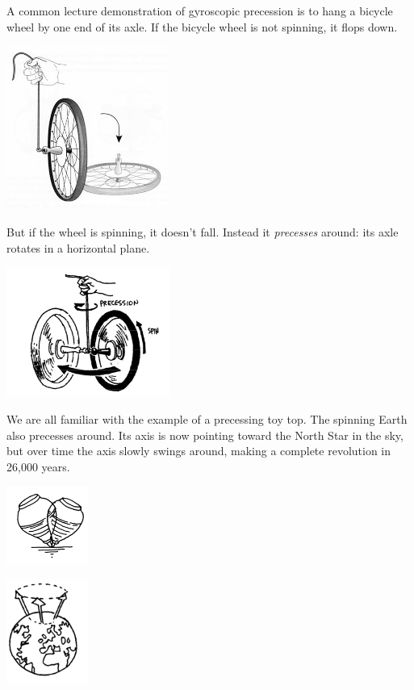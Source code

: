 A common lecture demonstration of gyroscopic precession is to hang a bicycle wheel by one end of its axle.  If the bicycle wheel is not spinning, it flops down.
\begin{center} \includegraphics*[width=0.4\textwidth]{imgs/6labs/6Alab/6Aexp7/precession_sm3.jpg} \end{center}
But if the wheel is spinning, it doesn't fall.  Instead it \textit{precesses} around: its axle rotates in a horizontal plane.
\begin{center} \includegraphics*[width=0.4\textwidth]{imgs/6labs/6Alab/6Aexp7/untitled.png} \end{center}
We are all familiar with the example of a precessing toy top.  The spinning Earth also precesses around.  Its axis is now pointing toward the North Star in the sky, but over time the axis slowly swings around, making a complete revolution in 26,000 years.
\begin{center} \includegraphics*[width=0.2\textwidth]{imgs/6labs/6Alab/6Aexp7/6a-exp7_fig2.png} \end{center}
\begin{center} \includegraphics*[width=0.2\textwidth]{imgs/6labs/6Alab/6Aexp7/6A-exp7_fig3-Copy.png} \end{center}
